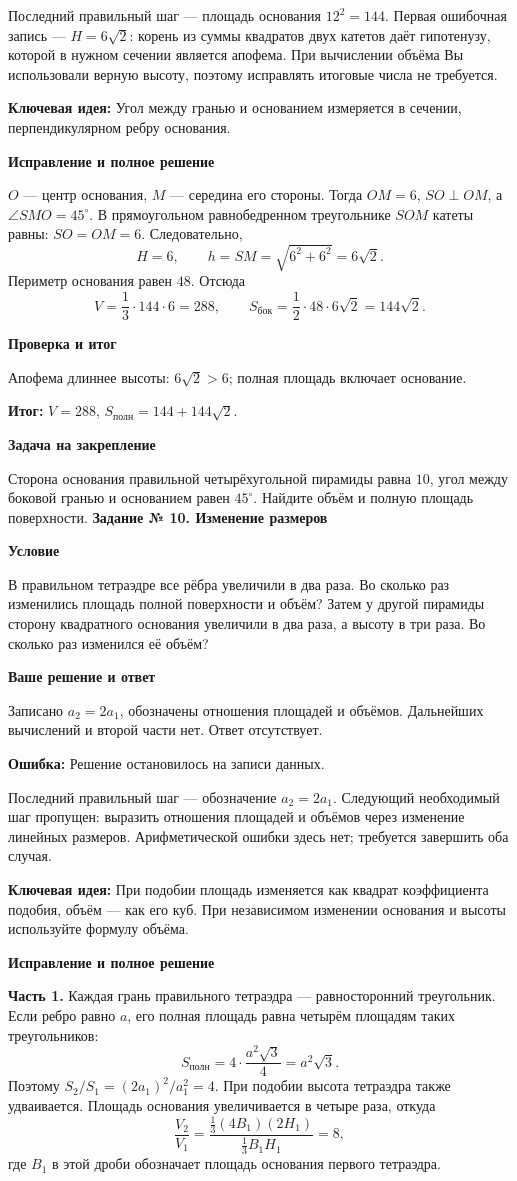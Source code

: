 \documentclass[a4paper,12pt]{article}
\newcommand{\sub}[1]{\par\smallskip\textbf{\color{darkaccent}#1}\par}
\newcommand{\err}[1]{\par\textcolor{red!70!black}{\textbf{Ошибка:}} #1\par}
\newcommand{\idea}[1]{\par\textcolor{blue!60!black}{\textbf{Ключевая идея:}} #1\par}
\newcommand{\result}[1]{\par\textcolor{teal!60!black}{\textbf{Итог:}} #1\par}
\newcommand{\task}[2]{\clearpage\phantomsection\label{task:#1}{\Large\color{darkaccent}\bfseries Задание № #1. #2}\par\smallskip{\color{accent}\rule{\linewidth}{0.45pt}}\par}
\begin{document}
Последний правильный шаг --- площадь основания $12^2=144$. Первая ошибочная запись --- $H=6\sqrt2$: корень из суммы квадратов двух катетов даёт гипотенузу, которой в нужном сечении является апофема. При вычислении объёма Вы использовали верную высоту, поэтому исправлять итоговые числа не требуется.
\idea{Угол между гранью и основанием измеряется в сечении, перпендикулярном ребру основания.}
\begin{center}
\end{center}
\sub{Исправление и полное решение}
$O$ --- центр основания, $M$ --- середина его стороны. Тогда $OM=6$, $SO\perp OM$, а $\angle SMO=45^\circ$. В прямоугольном равнобедренном треугольнике $SOM$ катеты равны: $SO=OM=6$. Следовательно,
\[
H=6,\qquad h=SM=\sqrt{6^2+6^2}=6\sqrt2.
\]
Периметр основания равен $48$. Отсюда
\[
V=\frac13\cdot144\cdot6=288,
\qquad S_{\text{бок}}=\frac12\cdot48\cdot6\sqrt2=144\sqrt2.
\]
\sub{Проверка и итог} Апофема длиннее высоты: $6\sqrt2>6$; полная площадь включает основание. \result{$V=288$, $S_{\text{полн}}=144+144\sqrt2$.}
\sub{Задача на закрепление} Сторона основания правильной четырёхугольной пирамиды равна $10$, угол между боковой гранью и основанием равен $45^\circ$. Найдите объём и полную площадь поверхности.
\task{10}{Изменение размеров}
\sub{Условие} В правильном тетраэдре все рёбра увеличили в два раза. Во сколько раз изменились площадь полной поверхности и объём? Затем у другой пирамиды сторону квадратного основания увеличили в два раза, а высоту в три раза. Во сколько раз изменился её объём?
\sub{Ваше решение и ответ} Записано $a_2=2a_1$, обозначены отношения площадей и объёмов. Дальнейших вычислений и второй части нет. Ответ отсутствует.
\err{Решение остановилось на записи данных.}
Последний правильный шаг --- обозначение $a_2=2a_1$. Следующий необходимый шаг пропущен: выразить отношения площадей и объёмов через изменение линейных размеров. Арифметической ошибки здесь нет; требуется завершить оба случая.
\idea{При подобии площадь изменяется как квадрат коэффициента подобия, объём --- как его куб. При независимом изменении основания и высоты используйте формулу объёма.}
\sub{Исправление и полное решение}
\textbf{Часть 1.} Каждая грань правильного тетраэдра --- равносторонний треугольник. Если ребро равно $a$, его полная площадь равна четырём площадям таких треугольников:
\[S_{\text{полн}}=4\cdot\frac{a^2\sqrt3}{4}=a^2\sqrt3.\]
Поэтому $S_2/S_1=(2a_1)^2/a_1^2=4$. При подобии высота тетраэдра также удваивается. Площадь основания увеличивается в четыре раза, откуда
\[\frac{V_2}{V_1}=\frac{\frac13(4B_1)(2H_1)}{\frac13 B_1H_1}=8,\]
где $B_1$ в этой дроби обозначает площадь основания первого тетраэдра.
\end{document}
